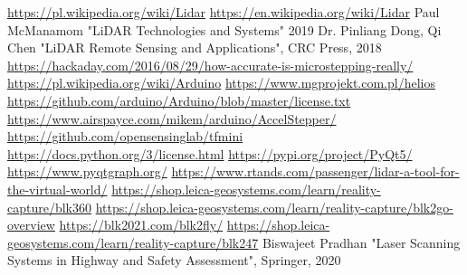 \documentclass{thesis}
\begin{document}

\newpage
\tableofcontents
\newpage









\begin{thebibliography}{10}
 \url{https://pl.wikipedia.org/wiki/Lidar}
 \url{https://en.wikipedia.org/wiki/Lidar}
 Paul McManamom "LiDAR Technologies and Systems" 2019
 Dr. Pinliang Dong, Qi Chen "LiDAR Remote Sensing and Applications", CRC Press, 2018
 \url{https://hackaday.com/2016/08/29/how-accurate-is-microstepping-really/}
 \url{https://pl.wikipedia.org/wiki/Arduino}
 \url{https://www.mgprojekt.com.pl/helios}
 \url{https://github.com/arduino/Arduino/blob/master/license.txt}
 \url{https://www.airspayce.com/mikem/arduino/AccelStepper/}
 \url{https://github.com/opensensinglab/tfmini}
 \url{https://docs.python.org/3/license.html}
 \url{https://pypi.org/project/PyQt5/}
 \url{https://www.pyqtgraph.org/}
 \url{https://www.rtands.com/passenger/lidar-a-tool-for-the-virtual-world/}
 \url{https://shop.leica-geosystems.com/learn/reality-capture/blk360}
 \url{https://shop.leica-geosystems.com/learn/reality-capture/blk2go-overview}
 \url{https://blk2021.com/blk2fly/}
 \url{https://shop.leica-geosystems.com/learn/reality-capture/blk247}
 Biswajeet Pradhan "Laser Scanning Systems in Highway and Safety Assessment", Springer, 2020

\end{thebibliography}
\newpage
\listoffigures
\end{document}

